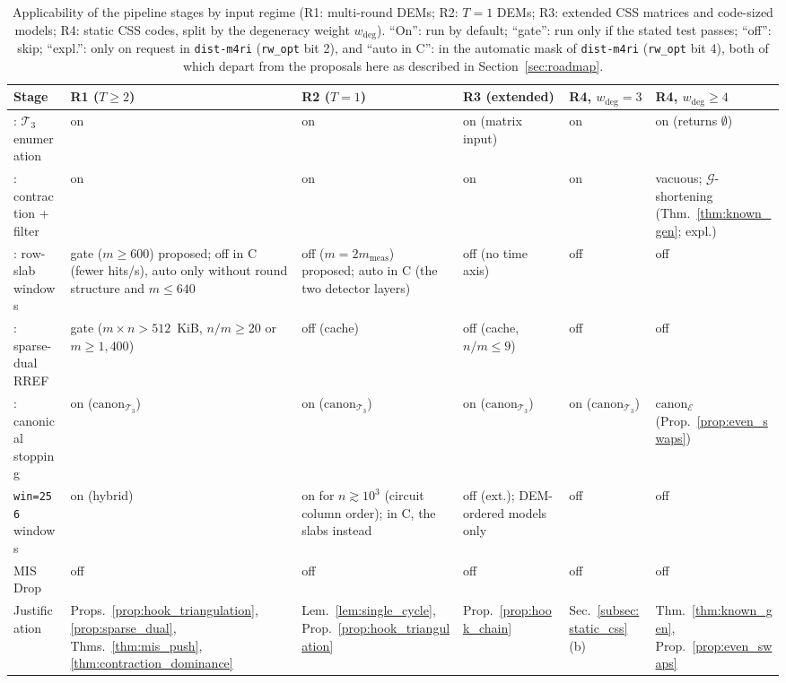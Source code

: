 \documentclass[12pt]{article}
\theoremstyle{definition}
\newcommand{\Tc}{\mathcal{T}_3}
\newcommand{\Gc}{\mathcal{G}}
\newcommand{\ttt}[1]{\texttt{#1}}
\begin{document}
\begin{table}[htbp]
\centering
\caption{Applicability of the pipeline stages by input regime (R1: multi-round DEMs; R2: $T = 1$ DEMs; R3: extended
CSS matrices and code-sized models; R4: static CSS codes, split by the degeneracy weight $w_{\deg}$). ``On'': run by
default; ``gate'': run only if the stated test passes; ``off'': skip; ``expl.'': only on request in \ttt{dist-m4ri}
(\ttt{rw\_opt} bit 2), and ``auto in C'': in the automatic mask of \ttt{dist-m4ri} (\ttt{rw\_opt} bit 4), both of
which depart from the proposals here as described in Section~\ref{sec:roadmap}.}\label{tab:stage_matrix}
\smallskip
\scriptsize
\setlength{\tabcolsep}{3.0pt}
\begin{tabular}{@{}>{\raggedright\arraybackslash}p{}
  >{\raggedright\arraybackslash}p{}>{\raggedright\arraybackslash}p{}
  >{\raggedright\arraybackslash}p{}>{\raggedright\arraybackslash}p{}
  >{\raggedright\arraybackslash}p{}@{}}
\toprule
Stage & R1 ($T \ge 2$) & R2 ($T = 1$) & R3 (extended) & R4, $w_{\deg} = 3$ & R4, $w_{\deg} \ge 4$ \\
\midrule
1: $\Tc$ enumeration & on & on & on (matrix input) & on & on (returns $\emptyset$) \\
2: contraction + filter & on & on & on & on & vacuous; $\Gc$-shortening (Thm.~\ref{thm:known_gen}; expl.) \\
3: row-slab windows & gate ($m \ge 600$) proposed; off in C (fewer hits/s), auto only without round structure and
  $m \le 640$ & off ($m = 2 m_{\mathrm{meas}}$) proposed; auto in C (the two detector layers) & off (no time axis) &
  off & off \\
4: sparse-dual RREF & gate ($m \times n > 512$~KiB, $n/m \ge 20$ or $m \ge 1{,}400$) & off (cache) & off (cache,
  $n/m \le 9$) & off & off \\
5: canonical stopping & on ($\mathrm{canon}_{\Tc}$) & on ($\mathrm{canon}_{\Tc}$) & on ($\mathrm{canon}_{\Tc}$) &
  on ($\mathrm{canon}_{\Tc}$) & $\mathrm{canon}_{\mathcal{E}}$ (Prop.~\ref{prop:even_swaps}) \\
\ttt{win=256} windows & on (hybrid) & on for $n \gtrsim 10^3$ (circuit column order); in C, the slabs instead & off
  (ext.); DEM-ordered models only & off & off \\
MIS Drop & off & off & off & off & off \\
Justification & Props.~\ref{prop:hook_triangulation}, \ref{prop:sparse_dual}, Thms.~\ref{thm:mis_push},
  \ref{thm:contraction_dominance} & Lem.~\ref{lem:single_cycle}, Prop.~\ref{prop:hook_triangulation} &
  Prop.~\ref{prop:hook_chain} & Sec.~\ref{subsec:static_css}(b) & Thm.~\ref{thm:known_gen},
  Prop.~\ref{prop:even_swaps} \\
\bottomrule
\end{tabular}
\end{table}
\end{document}
